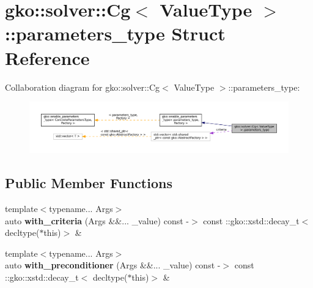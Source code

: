 \hypertarget{structgko_1_1solver_1_1Cg_1_1parameters__type}{}\section{gko\+:\+:solver\+:\+:Cg$<$ Value\+Type $>$\+:\+:parameters\+\_\+type Struct Reference}
\label{structgko_1_1solver_1_1Cg_1_1parameters__type}


Collaboration diagram for gko\+:\+:solver\+:\+:Cg$<$ Value\+Type $>$\+:\+:parameters\+\_\+type\+:
\nopagebreak
\begin{figure}[H]
\begin{center}
\leavevmode
\includegraphics[width=350pt]{structgko_1_1solver_1_1Cg_1_1parameters__type__coll__graph}
\end{center}
\end{figure}
\subsection*{Public Member Functions}
\begin{DoxyCompactItemize}
\item 
\mbox{\label{structgko_1_1solver_1_1Cg_1_1parameters__type_a331bfce3b672e431e11d32d36de8c13f}} 
{\footnotesize template$<$typename... Args$>$ }\\auto {\bfseries with\+\_\+criteria} (Args \&\&... \+\_\+value) const -\/$>$ const \+::gko\+::xstd\+::decay\+\_\+t$<$ decltype($\ast$this)$>$ \&
\item 
\mbox{\label{structgko_1_1solver_1_1Cg_1_1parameters__type_a507a49fe025fc5821d187d26aecdc24a}} 
{\footnotesize template$<$typename... Args$>$ }\\auto {\bfseries with\+\_\+preconditioner} (Args \&\&... \+\_\+value) const -\/$>$ const \+::gko\+::xstd\+::decay\+\_\+t$<$ decltype($\ast$this)$>$ \&
\end{DoxyCompactItemize}
